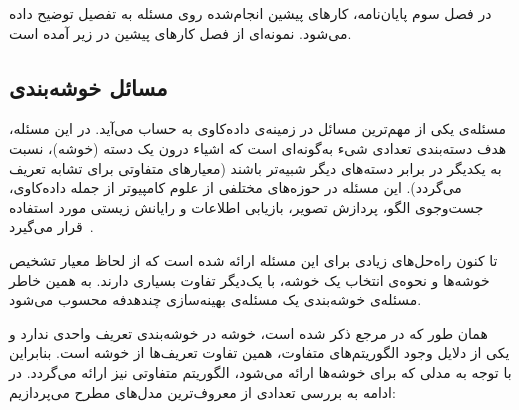 در فصل سوم پایان‌نامه، کارهای پیشین انجام‌شده روی مسئله به تفصیل توضیح داده می‌شود.
نمونه‌ای از فصل کارهای پیشین در زیر آمده است.


\subsection{مسائل خوشه‌بندی}

مسئله‌ی  یکی از مهم‌ترین مسائل در زمینه‌ی داده‌کاوی به حساب می‌آید.
در این مسئله، هدف دسته‌بندی تعدادی شیء به‌گونه‌ای است که اشیاء درون یک دسته (خوشه)، نسبت به یکدیگر در برابر دسته‌های دیگر شبیه‌تر باشند (معیارهای متفاوتی برای تشابه تعریف می‌گردد).
این مسئله در حوزه‌های مختلفی از علوم کامپیوتر از جمله داده‌کاوی، جست‌وجوی الگو، پردازش تصویر، بازیابی اطلاعات و رایانش زیستی مورد استفاده قرار می‌گیرد~.

تا کنون راه‌حل‌های زیادی برای این مسئله ارائه شده است که از لحاظ معیار تشخیص خوشه‌ها و نحوه‌ی انتخاب یک خوشه، با یک‌دیگر تفاوت بسیاری دارند.
به همین خاطر مسئله‌ی خوشه‌بندی یک مسئله‌ی بهینه‌سازی چندهدفه محسوب می‌شود.


همان طور که در مرجع  ذکر شده است، خوشه در خوشه‌بندی تعریف واحدی ندارد و یکی از دلایل وجود الگوریتم‌های متفاوت، همین تفاوت تعریف‌ها از خوشه است.
بنابراین با توجه به مدلی که برای خوشه‌ها ارائه می‌شود، الگوریتم متفاوتی نیز ارائه می‌گردد.
در ادامه به بررسی تعدادی از معروف‌ترین مدل‌های مطرح می‌پردازیم:






